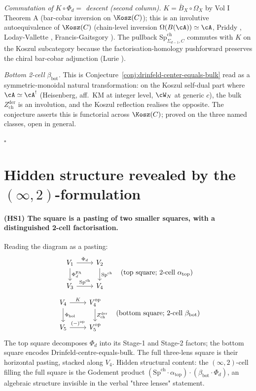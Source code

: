 \emph{Commutation of $K\circ\Phi_d = $ descent (second column).}
$K = \bar B_X \circ \Omega_X$ by Vol I Theorem A (bar-cobar inversion
on $\Kosz(C)$); this is an involutive autoequivalence of $\Kosz(C)$
(chain-level inversion $\Omega(B(\cA))\simeq\cA$, Priddy
\cite{Priddy70}, Loday-Vallette \cite{LV12}, Francis-Gaitsgory
\cite[Theorem~1.2.4]{FrancisGaitsgory2012}). The pullback
$\mathrm{Sp}^{\mathrm{ch}}_{\Sigma_{d-1},C}$ commutes with $K$ on the
Koszul subcategory because the factorisation-homology pushforward
preserves the chiral bar-cobar adjunction (Lurie \cite[HA.5.5.3.6
and HA.5.5.4]{LurieHA}).

\emph{Bottom 2-cell $\beta_{\mathrm{bot}}$.} This is
Conjecture~\ref{conj:drinfeld-center-equals-bulk} read as a
symmetric-monoidal natural transformation: on the Koszul self-dual
part where $\cA \simeq \cA^!$ (Heisenberg, aff.~KM at integer level,
$\cW_N$ at generic $c$), the bulk $Z^{\mathrm{der}}_{\mathrm{ch}}$ is
an involution, and the Koszul reflection realises the opposite. The
conjecture asserts this is functorial across $\Kosz(C)$; proved on
the three named classes, open in general.

\hfill $\square$


\section*{Hidden structure revealed by the $(\infty,2)$-formulation}

\paragraph*{(HS1) The square is a pasting of two smaller squares, with
a distinguished 2-cell factorisation.} Reading the diagram as a pasting:
\[
\begin{tikzcd}
 V_1 \arrow[r, "\Phi_d"] \arrow[d, "\Phi^{\mathrm{FA}}_d"' swap]
 & V_2 \arrow[d, "\mathrm{Sp}^{\mathrm{ch}}"] \\
 V_3 \arrow[r, "\mathrm{Sp}^{\mathrm{ch}}"' swap] & V_4
\end{tikzcd}
\quad \text{(top square; 2-cell } \alpha_{\mathrm{top}} \text{)}
\]
\[
\begin{tikzcd}
 V_4 \arrow[r, "K"] \arrow[d, "\Phi_{\mathrm{hol}}"' swap] &
 V_4^{\mathrm{op}} \arrow[d, "Z^{\mathrm{der}}_{\mathrm{ch}}"] \\
 V_5 \arrow[r, "(-)^{\mathrm{op}}"' swap] & V_5^{\mathrm{op}}
\end{tikzcd}
\quad \text{(bottom square; 2-cell } \beta_{\mathrm{bot}} \text{)}
\]
The top square decomposes $\Phi_d$ into its Stage-1 and Stage-2
factors; the bottom square encodes Drinfeld-centre-equals-bulk. The
full three-lens square is their horizontal pasting, stacked along
$V_4$. Hidden structural content: the $(\infty,2)$-cell filling the
full square is the Godement product
$(\mathrm{Sp}^{\mathrm{ch}}\cdot\alpha_{\mathrm{top}})\cdot
(\beta_{\mathrm{bot}}\cdot\Phi_d)$, an algebraic structure invisible
in the verbal "three lenses" statement.

